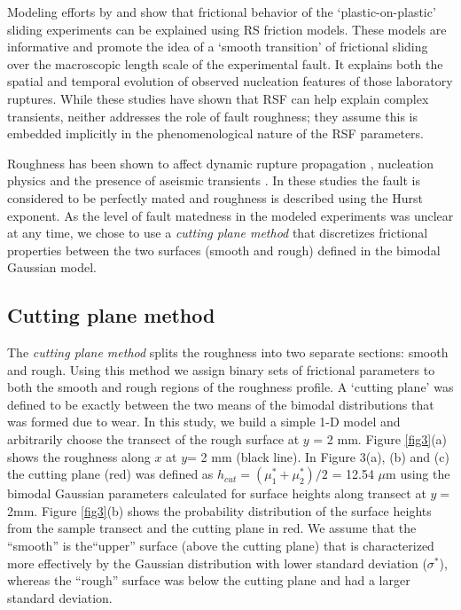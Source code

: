 \documentclass[preprint,1p, 10pt,authoryear]{elsarticle}
\begin{document}
Modeling efforts by \citet{Kaneko2011} and \citet{Kaneko2016} show that frictional behavior of the `plastic-on-plastic' sliding experiments can be explained using RS friction models. These models are informative and promote the idea of a `smooth transition' of frictional sliding over the macroscopic length scale of the experimental fault. It explains both the spatial and temporal evolution of observed nucleation features of those laboratory ruptures. While these studies have shown that RSF can help explain complex transients, neither addresses the role of fault roughness; they assume this is embedded implicitly in the phenomenological nature of the RSF parameters.

Roughness has been shown to affect dynamic rupture propagation \citep[e.g.][]{Dunham2011, Fang2013}, nucleation physics \citep[e.g.][]{Tal2018} and the presence of aseismic transients \citep{Ozawa2019}. In these studies the fault is considered to be perfectly mated and roughness is described using the Hurst exponent. As the level of fault matedness in the modeled experiments was unclear at any time, we chose to use a \textit{cutting plane method} that discretizes frictional properties between the two surfaces (smooth and rough) defined in the bimodal Gaussian model.

\subsection{Cutting plane method}
The \textit{cutting plane method} splits the roughness into two separate sections: smooth and rough. Using this method we assign binary sets of frictional parameters to both the smooth and rough regions of the roughness profile. A `cutting plane' was defined to be exactly between the two means of the bimodal distributions that was formed due to wear. In this study, we build a simple 1-D model and arbitrarily choose the transect of the rough surface at $y$ = 2 mm. Figure \ref{fig3}(a) shows the roughness along $x$ at $y$= 2 mm (black line). In Figure 3(a), (b) and (c) the cutting plane (red) was defined as $h_{cut} = \left(\mu^{*}_{1}+\mu^{*}_{2} \right)/2$ = 12.54 $\mu$m using the bimodal Gaussian parameters calculated for surface heights along transect at $y = $ 2mm. Figure \ref{fig3}(b) shows the probability distribution of the surface heights from the sample transect and the cutting plane in red. We assume that the ``smooth'' is the``upper'' surface (above the cutting plane) that is characterized more effectively by the Gaussian distribution with lower standard deviation ($\sigma^{*}$), whereas the ``rough'' surface was below the cutting plane and had a larger standard deviation.
\end{document}
